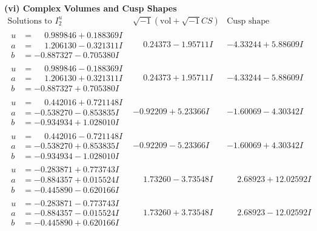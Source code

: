 \documentclass[1p]{elsarticle_modified}
\theoremstyle{definition}
\newcommand{\I}{\sqrt{-1}}
\begin{document}
\newpage\flushleft \textbf{(vi) Complex Volumes and Cusp Shapes}
$$\begin{array}{c|c|c}  
\text{Solutions to }I^u_{2}& \I (\text{vol} + \sqrt{-1}CS) & \text{Cusp shape}\\
 \hline 
\begin{aligned}
u &= \phantom{-}0.989846 + 0.188369 I \\
a &= \phantom{-}1.206130 - 0.321311 I \\
b &= -0.887327 - 0.705380 I\end{aligned}
 & \phantom{-}0.24373 - 1.95711 I & -4.33244 + 5.88609 I \\ \hline\begin{aligned}
u &= \phantom{-}0.989846 - 0.188369 I \\
a &= \phantom{-}1.206130 + 0.321311 I \\
b &= -0.887327 + 0.705380 I\end{aligned}
 & \phantom{-}0.24373 + 1.95711 I & -4.33244 - 5.88609 I \\ \hline\begin{aligned}
u &= \phantom{-}0.442016 + 0.721148 I \\
a &= -0.538270 - 0.853835 I \\
b &= -0.934934 + 1.028010 I\end{aligned}
 & -0.92209 + 5.23366 I & -1.60069 - 4.30342 I \\ \hline\begin{aligned}
u &= \phantom{-}0.442016 - 0.721148 I \\
a &= -0.538270 + 0.853835 I \\
b &= -0.934934 - 1.028010 I\end{aligned}
 & -0.92209 - 5.23366 I & -1.60069 + 4.30342 I \\ \hline\begin{aligned}
u &= -0.283871 + 0.773743 I \\
a &= -0.884357 + 0.015524 I \\
b &= -0.445890 - 0.620166 I\end{aligned}
 & \phantom{-}1.73260 - 3.73548 I & \phantom{-}2.68923 + 12.02592 I \\ \hline\begin{aligned}
u &= -0.283871 - 0.773743 I \\
a &= -0.884357 - 0.015524 I \\
b &= -0.445890 + 0.620166 I\end{aligned}
 & \phantom{-}1.73260 + 3.73548 I & \phantom{-}2.68923 - 12.02592 I \\ \hline\begin{aligned}

\end{aligned}
\end{array}$$
\end{document}
